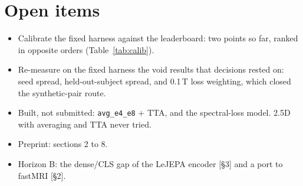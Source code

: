 \documentclass[10pt,a4paper]{article}
\begin{document}
\section{Open items}\label{sec:open}

\begin{itemize}
  \item Calibrate the fixed harness against the leaderboard: two points so far, ranked in opposite
        orders (Table~\ref{tab:calib}).
  \item Re-measure on the fixed harness the void results that decisions rested on: seed spread,
        held-out-subject spread, and 0.1\,T loss weighting, which closed the synthetic-pair route.
  \item Built, not submitted: \texttt{avg\_e4\_e8} + TTA, and the spectral-loss model. 2.5D with
        averaging and TTA never tried.
  \item Preprint: sections 2 to 8.
  \item Horizon B: the dense/CLS gap of the LeJEPA encoder [\S3] and a port to fastMRI [\S2].
\end{itemize}
\end{document}
